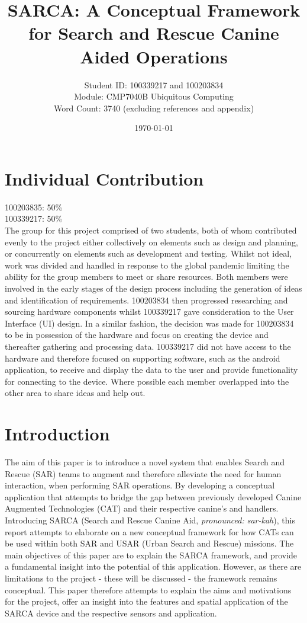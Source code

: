 \documentclass{ueacmpstyle}
\title{SARCA: A Conceptual Framework for Search and Rescue Canine Aided Operations}
\author{
	Student ID: 100339217 and 100203834 \\
	Module: CMP7040B Ubiquitous Computing \\
	Word Count: 3740 (excluding references and appendix)
}
\date{\today}
\begin{document}
    \maketitle

    \section{Individual Contribution} \label{Sec: Individual Contribution}
        100203835: 50\%\\
        100339217: 50\%\\
        The group for this project comprised of two students, both of whom contributed evenly to the project either collectively on elements such as design and planning, or concurrently on elements such as development and testing.  Whilst not ideal, work was divided and handled in response to the global pandemic limiting the ability for the group members to meet or share resources.  Both members were involved in the early stages of the design process including the generation of ideas and identification of requirements. 100203834 then progressed researching and sourcing hardware components whilst 100339217 gave consideration to the User Interface (UI) design.  In a similar fashion, the decision was made for 100203834 to be in possession of the hardware and focus on creating the device and thereafter gathering and processing data.  100339217 did not have access to the hardware and therefore focused on supporting software, such as the android application, to receive and display the data to the user and provide functionality for connecting to the device. Where possible each member overlapped into the other area to share ideas and help out.  

    \section{Introduction}\label{Sec: Intro}
    The aim of this paper is to introduce a novel system that enables Search and Rescue (SAR) teams to augment and therefore alleviate the need for human interaction, when performing SAR operations. By developing a conceptual application that attempts to bridge the gap between previously developed Canine Augmented Technologies (CAT) and their respective canine's and handlers. Introducing SARCA (Search and Rescue Canine Aid, \textit{pronounced: sar-kah}), this report attempts to elaborate on a new conceptual framework for how CATs can be used within both SAR and USAR (Urban Search and Rescue) missions. The main objectives of this paper are to explain the SARCA framework, and provide a fundamental insight into the potential of this application. However, as there are limitations to the project - these will be discussed - the framework remains conceptual. This paper therefore attempts to explain the aims and motivations for the project, offer an insight into the features and spatial application of the SARCA device and the respective sensors and application.
    
\end{document}
